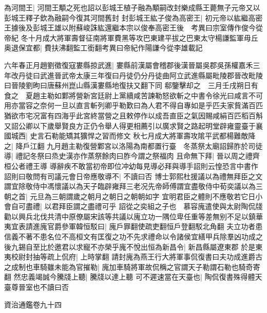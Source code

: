 為河間王|{
	河間王顒之死也詔以彭城王植子融為顒嗣改封樂成縣王薨無子元帝又以彭城王釋子欽為融嗣今復其河間舊封}
封彭城王紘子俊為高密王|{
	初元帝以紘繼高密王據後及彭城王雄以附蘇峻誅紘還繼本宗以俊奉高密王後　考異曰宗室傳作俊今從帝紀}
冬十月成大將軍壽督征南將軍費黑等攻巴東建平拔之巴東太守楊謙監軍毋丘奥退保宜都|{
	費扶沸翻監工銜翻考異曰帝紀作陽謙今從李雄載記}


六年春正月趙劉徵復寇婁縣掠武進|{
	婁縣前漢屬會稽郡後漢晉屬吳郡吳孫權嘉禾三年改丹徒曰武進晉武帝太康三年復曰丹徒仍分丹徒曲阿立武進縣屬毗陵郡晉改毗陵曰晉陵劉昫曰唐蘇州崑山縣漢婁縣地復扶又翻下同}
郗鑒擊却之　三月壬戌朔日有食之　夏趙主勒如鄴將營新宮廷尉上黨續咸苦諫勒怒欲斬之中書令徐光曰咸言不可用亦當容之奈何一旦以直言斬列卿乎勒歎曰為人君不得自專如是乎匹夫家貲滿百匹猶欲市宅况富有四海乎此宮終當營之且敕停作以成吾直臣之氣因賜咸絹百匹稻百斛又詔公卿以下歲舉賢良方正仍令舉人得更相薦引以廣求賢之路起明堂辟雍靈臺于襄國城西|{
	史言石勒能矯其獷悍之習而修文}
秋七月成大將軍壽攻隂平武都楊難敵降之|{
	降戶江翻}
九月趙主勒復營鄴宮以洛陽為南都置行臺　冬蒸祭太廟詔歸胙於司徒導|{
	禮記冬祭曰烝史漢亦作蒸祭餘肉曰胙今謂之祭福肉}
且命無下拜|{
	晉以周之禮齊桓公者禮王導}
導辭疾不敢當初帝即位冲幼每見導必拜與導手詔則云惶恐言中書作詔則曰敬問有司議元會日帝應敬導不|{
	不讀曰否}
博士郭熙杜援議以為禮無拜臣之文謂宜除敬侍中馮懷議以為天子臨辟雍拜三老况先帝師傅謂宜盡敬侍中荀奕議以為三朝之首|{
	元旦為三朝謂歲之朝月之朝日之朝朝如字}
宜明君臣之體則不應敬若它日小會自可盡禮|{
	以君拜臣謂之盡禮可乎}
詔從之奕組之子也　慕容廆遣使與太尉陶侃牋勸以興兵北伐共清中原僚屬宋該等共議以廆立功一隅位卑任重等差無别不足以鎮華夷宜表請進廆官爵參軍韓恒駁曰|{
	廆戶罪翻使疏吏翻恒戶登翻駁北角翻}
夫立功者患信義不著不患名位不高桓文有匡復之功不先求禮命以令諸侯宜繕甲兵除羣凶功成之後九錫自至比於邀君以求寵不亦榮乎廆不悅出恒為新昌令|{
	新昌縣屬遼東郡}
於是東夷校尉封抽等疏上侃府|{
	上時掌翻}
請封廆為燕王行大將軍事侃復書曰夫功成進爵古之成制也車騎雖未能為官摧勒|{
	廆加車騎將軍故侃稱之官謂天子勒謂石勒也騎奇寄翻}
然忠義竭誠今騰牋上聽|{
	騰牋以達上聽}
可不遲速當在天臺也|{
	陶侃復書殊得體天臺尊晉室也不讀曰否}


資治通鑑卷九十四
